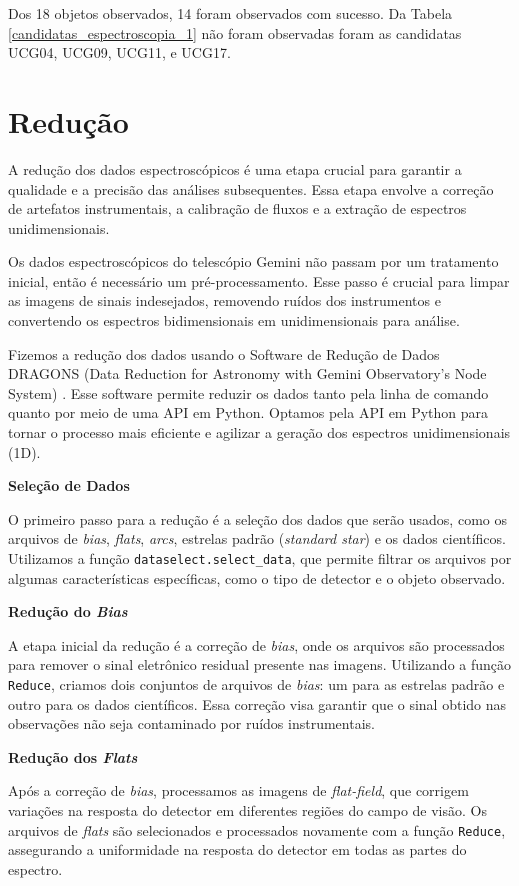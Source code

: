Dos 18 objetos observados, 14 foram observados com sucesso. Da Tabela \ref{candidatas_espectroscopia_1} não foram observadas foram as candidatas UCG04, UCG09, UCG11, e UCG17.

\section{Redução}\label{sec:reducao}
A redução dos dados espectroscópicos é uma etapa crucial para garantir a qualidade e a precisão das análises subsequentes. Essa etapa envolve a correção de artefatos instrumentais, a calibração de fluxos e a extração de espectros unidimensionais.

Os dados espectroscópicos do telescópio Gemini não passam por um tratamento inicial, então é necessário um pré-processamento. Esse passo é crucial para limpar as imagens de sinais indesejados, removendo ruídos dos instrumentos e convertendo os espectros bidimensionais em unidimensionais para análise.

Fizemos a redução dos dados usando o Software de Redução de Dados DRAGONS (Data Reduction for Astronomy with Gemini Observatory's Node System) \cite{dragons_python}. Esse software permite reduzir os dados tanto pela linha de comando quanto por meio de uma API em Python. Optamos pela API em Python para tornar o processo mais eficiente e agilizar a geração dos espectros unidimensionais (1D).

\textbf{Seleção de Dados}

O primeiro passo para a redução é a seleção dos dados que serão usados, como os arquivos de \textit{bias}, \textit{flats}, \textit{arcs}, estrelas padrão (\textit{standard star}) e os dados científicos. Utilizamos a função \verb|dataselect.select_data|, que permite filtrar os arquivos por algumas características específicas, como o tipo de detector e o objeto observado.

\textbf{Redução do \textit{Bias}}

A etapa inicial da redução é a correção de \textit{bias}, onde os arquivos são processados para remover o sinal eletrônico residual presente nas imagens. Utilizando a função \verb|Reduce|, criamos dois conjuntos de arquivos de \textit{bias}: um para as estrelas padrão e outro para os dados científicos. Essa correção visa garantir que o sinal obtido nas observações não seja contaminado por ruídos instrumentais.

\textbf{Redução dos \textit{Flats}}

Após a correção de \textit{bias}, processamos as imagens de \textit{flat-field}, que corrigem variações na resposta do detector em diferentes regiões do campo de visão. Os arquivos de \textit{flats} são selecionados e processados novamente com a função \verb|Reduce|, assegurando a uniformidade na resposta do detector em todas as partes do espectro.

